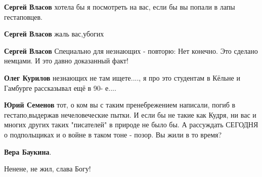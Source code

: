 \begin{itemize}
\begin{itemize}
\begin{itemize}
\textbf{Сергей Власов} хотела бы я посмотреть на вас, если бы вы попали в лапы гестаповцев.


 
\textbf{Сергей Власов} жаль вас,убогих


 
\textbf{Сергей Власов} Специально для незнающих - повторю: Нет конечно. Это сделано немцами. И это давно доказанный факт!


 
\textbf{Олег Курилов} незнающих не там ищете...., я про это студентам в Кёльне и Гамбурге рассказывал ещё в 90- е....
\end{itemize}

 
\textbf{Юрий Семенов} тот, о ком вы с таким пренебрежением написали, погиб в
гестапо,выдержав нечеловеческие пытки. И если бы не такие как Кудря, ни вас и
многих других таких "писателей" в природе не было бы. А рассуждать СЕГОДНЯ о
подпольщиках и о войне в таком тоне - позор. Вы жили в то время?

\begin{itemize}
 
\textbf{Вера Баукина}. 

Ненене, не жил, слава Богу!


\end{itemize}
\end{itemize}
\end{itemize}
